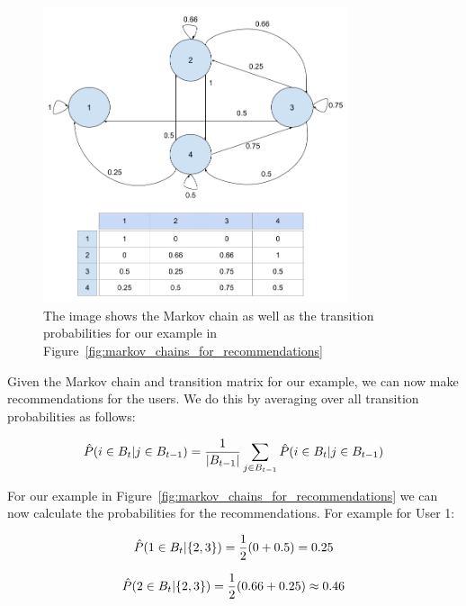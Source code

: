 \begin{figure}[htbp]
\centering
\includegraphics[width=0.8\textwidth]{images/illustrations/markov_chains_recommendations_2.png}
\caption{The image shows the Markov chain as well as the transition probabilities for our example in Figure~\ref{fig:markov_chains_for_recommendations}}
\label{fig:markov_chains_for_recommendations_2}
\end{figure}

Given the Markov chain and transition matrix for our example, we can now make recommendations for the users. We do this by averaging over all transition probabilities as follows:

\begin{equation}
\setlength{\jot}{25pt}
    \hat{P}(i\in B_t |j\in B_{t-1})=\frac{1}{|B_{t-1}|}  \sum_{j\in B_{t-1}} \hat{P}(i\in B_t |j\in B_{t-1})
    \label{equation:simplified_markov_chain_calc_2}
\end{equation}

For our example in Figure~\ref{fig:markov_chains_for_recommendations} we can now calculate the probabilities for the recommendations. For example for User 1:

\begin{equation*}
\setlength{\jot}{25pt}
    \hat{P}(1\in B_t| \{2,3\})=\frac{1}{2}(0+0.5)=0.25
\end{equation*}

\begin{equation*}
\setlength{\jot}{25pt}
    \hat{P}(2\in B_t| \{2,3\})=\frac{1}{2}(0.66+0.25) \approx 0.46
\end{equation*}

